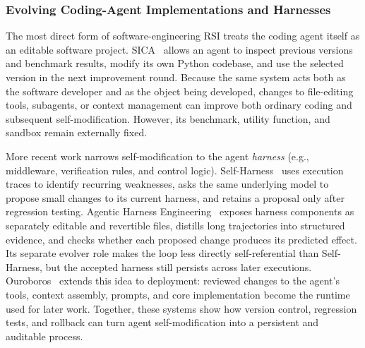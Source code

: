 

\subsubsection{Evolving Coding-Agent Implementations and Harnesses}

The most direct form of software-engineering RSI treats the coding agent itself as an editable software project. SICA~\cite{robeyns2025sica} allows an agent to inspect previous versions and benchmark results, modify its own Python codebase, and use the selected version in the next improvement round. 
Because the same system acts both as the software developer and as the object being developed, changes to file-editing tools, subagents, or context management can improve both ordinary coding and subsequent self-modification. 
However, its benchmark, utility function, and sandbox remain externally fixed.

More recent work narrows self-modification to the agent \emph{harness} (e.g., middleware, verification rules, and control logic). 
Self-Harness~\cite{zhang2026selfharness} uses execution traces to identify recurring weaknesses, asks the same underlying model to propose small changes to its current harness, and retains a proposal only after regression testing. 
Agentic Harness Engineering~\cite{lin2026ahe} exposes harness components as separately editable and revertible files, distills long trajectories into structured evidence, and checks whether each proposed change produces its predicted effect. Its separate evolver role makes the loop less directly self-referential than Self-Harness, but the accepted harness still persists across later executions. Ouroboros~\cite{razzhigaev2026ouroboros} extends this idea to deployment: reviewed changes to the agent's tools, context assembly, prompts, and core implementation become the runtime used for later work. 
Together, these systems show how version control, regression tests, and rollback can turn agent self-modification into a persistent and auditable process.



